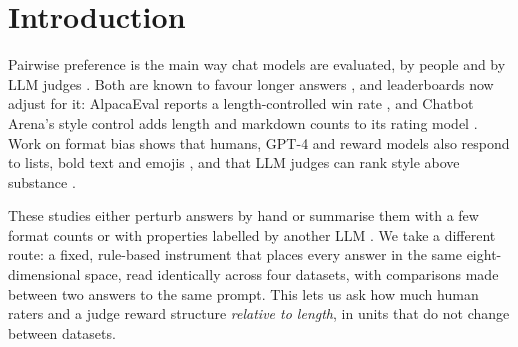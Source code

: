 \documentclass[11pt]{article}
\begin{document}
\section{Introduction}
Pairwise preference is the main way chat models are evaluated, by people \cite{chiang} and by LLM judges \cite{zheng}. Both are known to favour longer answers \cite{zheng,singhal,dubois}, and leaderboards now adjust for it: AlpacaEval reports a length-controlled win rate \cite{dubois}, and Chatbot Arena's style control adds length and markdown counts to its rating model \cite{stylecontrol}. Work on format bias shows that humans, GPT-4 and reward models also respond to lists, bold text and emojis \cite{emojis,humansllms}, and that LLM judges can rank style above substance \cite{wuaji,sos}.

These studies either perturb answers by hand or summarise them with a few format counts or with properties labelled by another LLM \cite{dissecting,vibecheck}. We take a different route: a fixed, rule-based instrument that places every answer in the same eight-dimensional space, read identically across four datasets, with comparisons made between two answers to the same prompt. This lets us ask how much human raters and a judge reward structure \emph{relative to length}, in units that do not change between datasets.
\end{document}
